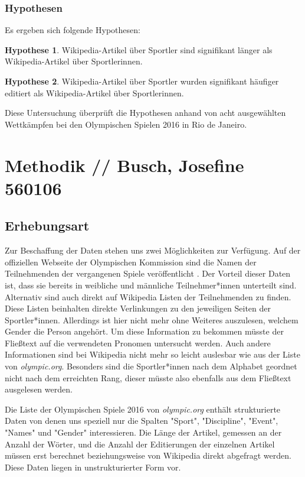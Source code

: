 \documentclass[11pt]{article}
\begin{document}
\subsubsection*{Hypothesen}

Es ergeben sich folgende Hypothesen:

\textbf{Hypothese 1}. Wikipedia-Artikel über Sportler sind signifikant länger als Wikipedia-Artikel über Sportlerinnen.

\textbf{Hypothese 2}. Wikipedia-Artikel über Sportler wurden signifikant häufiger editiert als Wikipedia-Artikel über Sportlerinnen.

Diese Untersuchung überprüft die Hypothesen anhand von acht ausgewählten Wettkämpfen bei den Olympischen Spielen 2016 in Rio de Janeiro.

\section{Methodik // Busch, Josefine 560106}
\label{igw}

\subsection{Erhebungsart}
Zur Beschaffung der Daten stehen uns zwei Möglichkeiten zur Verfügung. Auf der offiziellen Webseite der Olympischen Kommission sind die Namen der Teilnehmenden der vergangenen Spiele veröffentlicht \parencite{olympicResults}. Der Vorteil dieser Daten ist, dass sie bereits in weibliche und männliche Teilnehmer*innen unterteilt sind. Alternativ sind auch direkt auf Wikipedia Listen der Teilnehmenden zu finden. \parencite{wikiOlympicComp} Diese Listen beinhalten direkte Verlinkungen zu den jeweiligen Seiten der Sportler*innen. Allerdings ist hier nicht mehr ohne Weiteres auszulesen, welchem Gender die Person angehört. Um diese Information zu bekommen müsste der Fließtext auf die verwendeten Pronomen untersucht werden. Auch andere Informationen sind bei Wikipedia nicht mehr so leicht auslesbar wie aus der Liste von \textit{olympic.org}. Besonders sind die Sportler*innen nach dem Alphabet geordnet nicht nach dem erreichten Rang, dieser müsste also ebenfalls aus dem Fließtext ausgelesen werden.

Die Liste der Olympischen Spiele 2016 von \textit{olympic.org} enthält strukturierte Daten von denen uns speziell nur die Spalten "Sport", "Discipline", "Event", "Names" und "Gender" interessieren.
Die Länge der Artikel, gemessen an der Anzahl der Wörter, und die Anzahl der Editierungen der einzelnen Artikel müssen erst berechnet beziehungsweise von Wikipedia direkt abgefragt werden. Diese Daten liegen in unstrukturierter Form vor.
\end{document}
